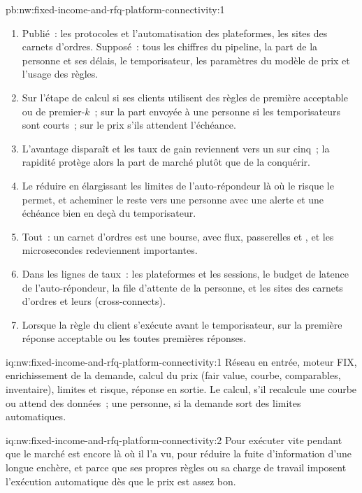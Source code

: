 \begin{solution}{pb:nw:fixed-income-and-rfq-platform-connectivity:1}
\begin{enumerate}[resume]
  le meilleur prix acceptable, et diviser par deux son temps de calcul rapporte 12.6 points de taux de gain contre 0.9 pour un centime de prix.
\item Publié~: les protocoles et l'automatisation des plateformes, les sites des carnets d'ordres. Supposé~: tous les chiffres du pipeline, la part de la personne et
  ses délais, le temporisateur, les paramètres du modèle de prix et l'usage des règles.
\item Sur l'étape de calcul si ses clients utilisent des règles de première acceptable ou de premier-$k$~; sur la part envoyée à une personne si les temporisateurs sont courts~; sur
  le prix s'ils attendent l'échéance.
\item L'avantage disparaît et les taux de gain reviennent vers un sur cinq~; la rapidité protège alors la part de marché plutôt que de la conquérir.
\item Le réduire en élargissant les limites de l'auto-répondeur là où le risque le permet, et acheminer le reste vers une personne avec une alerte et une
  échéance bien en deçà du temporisateur.
\item Tout~: un carnet d'ordres est une bourse, avec flux, passerelles et , et les microsecondes redeviennent importantes.
\item Dans les lignes de taux~: les plateformes et les sessions, le budget de latence de l'auto-répondeur, la file d'attente de la personne, et les sites des
  carnets d'ordres et leurs  (cross-connects).
\item Lorsque la règle du client s'exécute avant le temporisateur, sur la première réponse acceptable ou les toutes premières réponses.
\end{enumerate}
\end{solution}

\begin{solution}{iq:nw:fixed-income-and-rfq-platform-connectivity:1}
Réseau en entrée, moteur FIX, enrichissement de la demande, calcul du prix (fair value, courbe, comparables, inventaire), limites et risque, réponse en sortie. Le calcul,
s'il recalcule une courbe ou attend des données~; une personne, si la demande sort des limites automatiques.
\end{solution}

\begin{solution}{iq:nw:fixed-income-and-rfq-platform-connectivity:2}
Pour exécuter vite pendant que le marché est encore là où il l'a vu, pour réduire la fuite d'information d'une longue enchère, et parce que ses propres
règles ou sa charge de travail imposent l'exécution automatique dès que le prix est assez bon.
\end{solution}

